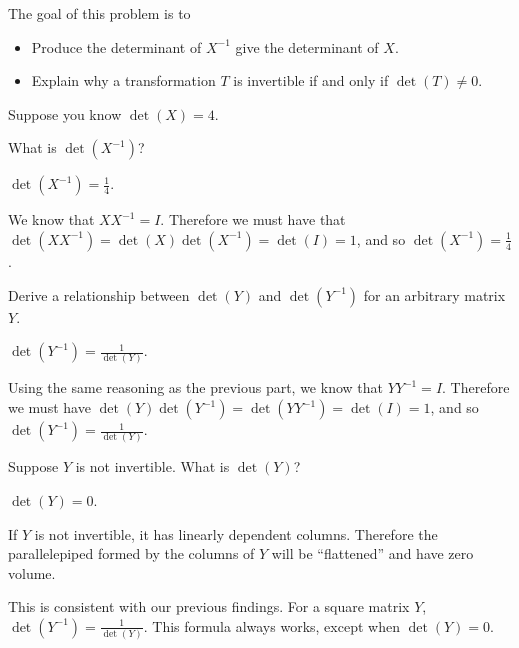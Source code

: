 \documentclass{workbook}
\newcommand{\bookonlynewpage}{\begin{bookonly}\newpage\end{bookonly}}
\begin{document}
\begin{slide}

	\bookonlynewpage
	\question
	\begin{annotation}
		\begin{goals}

			The goal of this problem is to
			\begin{itemize}
				\item Produce the determinant of $X^{-1}$ give the determinant of $X$.
				\item Explain why a transformation $T$ is invertible if and only if
					$\det(T)\neq 0$.
			\end{itemize}
		\end{goals}
	\end{annotation}
	Suppose you know $\det(X)=4$.
	\begin{parts}
		\item What is $\det(X^{-1})$?
			\begin{solution}
				$\det(X^{-1})=\frac{1}{4}$.

				We know that $XX^{-1}=I$. Therefore we must have that
				$\det(XX^{-1})=\det(X)\det(X^{-1})=\det(I)=1$,
				and so $\det(X^{-1})=\frac{1}{4}$.
			\end{solution}
		\item Derive a relationship between $\det(Y)$
			and $\det(Y^{-1})$ for an arbitrary matrix $Y$.
			\begin{solution}
				$\det(Y^{-1})=\frac{1}{\det(Y)}$.

				Using the same reasoning as the previous part, we know that
				$YY^{-1}=I$. Therefore we must have
				$\det(Y)\det(Y^{-1})=\det(YY^{-1})=\det(I)=1$, and so
				$\det(Y^{-1})=\frac{1}{\det(Y)}$.
			\end{solution}
		\item Suppose $Y$ is not invertible. What is $\det(Y)$?
			\begin{solution}
				$\det(Y)=0$.

				If $Y$ is not invertible, it has linearly dependent columns. Therefore
				the parallelepiped formed by the columns of $Y$ will be ``flattened''
				and have zero volume.

				This is consistent with our previous findings. For a square matrix $Y$,
				$\det(Y^{-1})=\frac{1}{\det(Y)}$. This
				formula always works, except when $\det(Y)=0$.
			\end{solution}
	\end{parts}
\end{slide}
\end{document}
